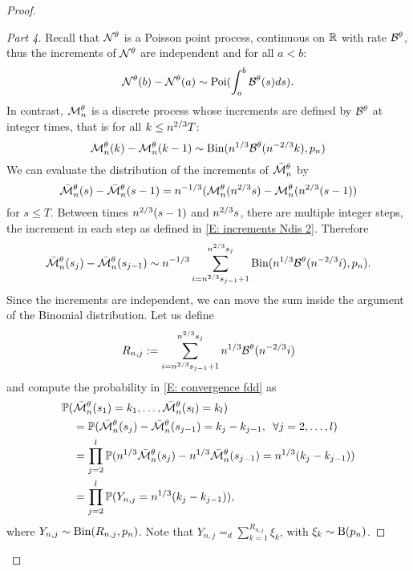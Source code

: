 \begin{proof}
\begin{proof}[Part 4]
Recall that $\mathcal{N}^{\theta}$ is a Poisson point process, continuous on $\mathbb{R}$ with rate $\mathcal{B}^{\theta}$,
thus the increments of $\mathcal{N}^{\theta}$ are independent and for all $a<b$: 
\begin{equation}
\mathcal{N}^{\theta}(b) - \mathcal{N}^{\theta}(a) \sim \operatorname*{Poi}( \int_{a}^{b} \mathcal{B}^{\theta}(s)ds).
\end{equation}
In contrast, $\mathcal{M}_n^{\theta}$ is a discrete process whose increments are defined by $\mathcal{B}^{\theta}$ at integer times, 
that is for all $k \leq n^{2 / 3}T$: 
\begin{equation} \label{E: increments Ndis 2}
\mathcal{M}_n^{\theta}(k) - \mathcal{M}_n^{\theta}(k-1) \sim \operatorname*{Bin}(n^{1 / 3}\mathcal{B}^{\theta}(n^{-2 / 3}k), p_n)
\end{equation}
We can evaluate the distribution of the increments of $\bar{\mathcal{M}}_n^{\theta}$ by
\begin{equation}
\bar{\mathcal{M}}_n^{\theta}(s) - \bar{\mathcal{M}}_n^{\theta}(s-1) = n^{-1 / 3}( \mathcal{M}_n^{\theta}(n^{2 / 3}s) - \mathcal{M}_n^{\theta}(n^{2 / 3}(s-1))
\end{equation}
for $s \leq T$.
Between times $n^{2 / 3}(s-1)$ and $n^{2 / 3}s$, there are multiple integer steps,
the increment in each step as defined in \eqref{E: increments Ndis 2}. 
Therefore
\begin{equation}
\bar{\mathcal{M}}_n^{\theta}(s_j) - \bar{\mathcal{M}}_n^{\theta}(s_{j-1}) \sim n^{-1 / 3} \sum_{i=n^{2 / 3}s_{j-1}+1}^{n^{2 / 3}s_j} \operatorname*{Bin}( n^{1 / 3}\mathcal{B}^{\theta}(n^{-2 / 3}i), p_n ).
\end{equation}
Since the increments are independent, we can move the sum inside the argument of the Binomial distribution.
Let us define 
\begin{equation*}
R_{n,j} := \sum_{i=n^{2 / 3}s_{j-1}+1}^{n^{2 / 3}s_j}n^{1 / 3}\mathcal{B}^{\theta}(n^{-2 / 3}i)
\end{equation*}
and compute the probability in \eqref{E: convergence fdd} as
\begin{equation} \label{E: distribution Ndis}
\begin{aligned}
&\mathbb{P}(\bar{\mathcal{M}}_n^{\theta}(s_1) = k_1, \dots, \bar{\mathcal{M}}_n^{\theta}(s_l) = k_l) \\
&\quad = \mathbb{P}( \bar{\mathcal{M}}_n^{\theta}(s_j) - \bar{\mathcal{M}}_n^{\theta}(s_{j-1}) = k_j - k_{j-1}, \enspace \forall j=2,\dots,l ) \\
&\quad = \prod_{j=2}^{l} \mathbb{P}( n^{1 / 3}\bar{\mathcal{M}}_n^{\theta}(s_j) - n^{1 / 3}\bar{\mathcal{M}}_n^{\theta}(s_{j-1}) = n^{1 / 3}(k_j - k_{j-1})) \\
&\quad = \prod_{j=2}^{l} \mathbb{P}( Y_{n,j} = n^{1 / 3}(k_j - k_{j-1}) ),
\end{aligned}
\end{equation}
where $Y_{n,j} \sim \operatorname*{Bin}(R_{n,j}, p_n)$.
Note that $Y_{n,j} =_d \sum_{k=1}^{R_{n,j}} \xi_k$, with $\xi_k \sim \operatorname*{B}(p_n)$.


\end{proof}
\end{proof}
